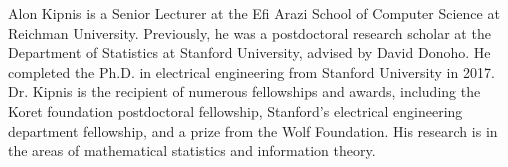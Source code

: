 Alon Kipnis is a Senior Lecturer at the Efi Arazi School of Computer Science at Reichman University. Previously, he was a postdoctoral research scholar at the Department of Statistics at Stanford University, advised by David Donoho. He completed the Ph.D. in electrical engineering from Stanford University in 2017. Dr. Kipnis is the recipient of numerous fellowships and awards, including the Koret foundation postdoctoral fellowship, Stanford's electrical engineering department fellowship, and a prize from the Wolf Foundation. His research is in the areas of mathematical statistics and information theory.
